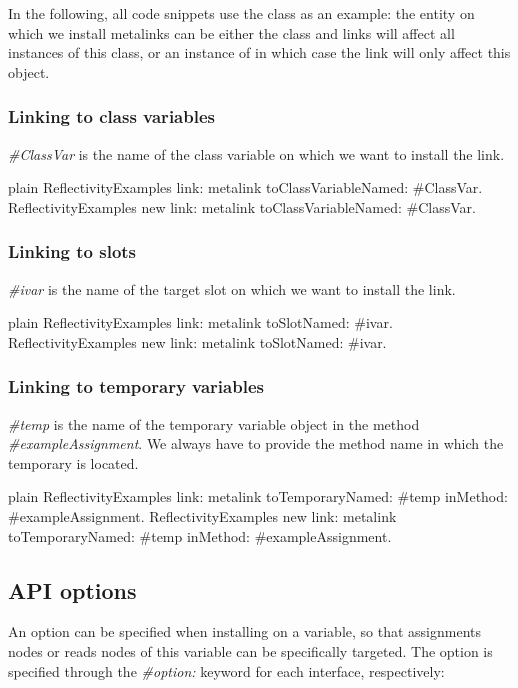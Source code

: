 \documentclass[10pt,twoside,english]{_support/latex/sbabook/sbabook}
\begin{document}
In the following, all code snippets use the class  as an example: the entity on which we install metalinks can be either the class  and links will affect all instances of this class, or an instance of  in which case the link will only affect this object.
\subsubsection{Linking to class variables}
\textit{\#ClassVar} is the name of the class variable on which we want to install the link.

\begin{displaycode}{plain}
ReflectivityExamples link: metalink toClassVariableNamed: #ClassVar.
ReflectivityExamples new link: metalink toClassVariableNamed: #ClassVar.
\end{displaycode}
\subsubsection{Linking to slots}
\textit{\#ivar} is the name of the target slot on which we want to install the link.

\begin{displaycode}{plain}
ReflectivityExamples link: metalink toSlotNamed: #ivar.
ReflectivityExamples new link: metalink toSlotNamed: #ivar.
\end{displaycode}
\subsubsection{Linking to temporary variables}
\textit{\#temp} is the name of the temporary variable object in the method \textit{\#exampleAssignment}. We always have to provide the method name in which the temporary is located.

\begin{displaycode}{plain}
ReflectivityExamples link: metalink toTemporaryNamed: #temp inMethod: #exampleAssignment.
ReflectivityExamples new link: metalink toTemporaryNamed: #temp inMethod: #exampleAssignment.
\end{displaycode}
\subsection{API options}
An option can be specified when installing on a variable, so that assignments nodes or reads nodes of this variable can be specifically targeted.
The option is specified through the \textit{\#option:} keyword for each interface, respectively:
\end{document}

